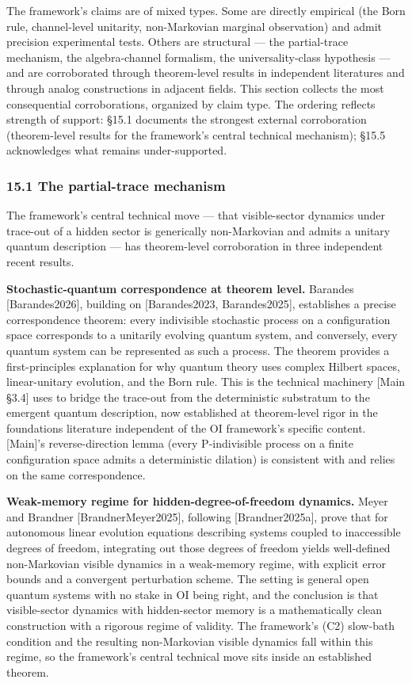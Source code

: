 \documentclass[
]{article}
\begin{document}
The framework's claims are of mixed types. Some are directly empirical
(the Born rule, channel-level unitarity, non-Markovian marginal
observation) and admit precision experimental tests. Others are
structural --- the partial-trace mechanism, the algebra-channel
formalism, the universality-class hypothesis --- and are corroborated
through theorem-level results in independent literatures and through
analog constructions in adjacent fields. This section collects the most
consequential corroborations, organized by claim type. The ordering
reflects strength of support: §15.1 documents the strongest external
corroboration (theorem-level results for the framework's central
technical mechanism); §15.5 acknowledges what remains under-supported.

\hypertarget{the-partial-trace-mechanism}{%
\subsubsection{15.1 The partial-trace
mechanism}\label{the-partial-trace-mechanism}}

The framework's central technical move --- that visible-sector dynamics
under trace-out of a hidden sector is generically non-Markovian and
admits a unitary quantum description --- has theorem-level corroboration
in three independent recent results.

\textbf{Stochastic-quantum correspondence at theorem level.} Barandes
{[}Barandes2026{]}, building on {[}Barandes2023, Barandes2025{]},
establishes a precise correspondence theorem: every indivisible
stochastic process on a configuration space corresponds to a unitarily
evolving quantum system, and conversely, every quantum system can be
represented as such a process. The theorem provides a first-principles
explanation for why quantum theory uses complex Hilbert spaces,
linear-unitary evolution, and the Born rule. This is the technical
machinery {[}Main §3.4{]} uses to bridge the trace-out from the
deterministic substratum to the emergent quantum description, now
established at theorem-level rigor in the foundations literature
independent of the OI framework's specific content. {[}Main{]}'s
reverse-direction lemma (every P-indivisible process on a finite
configuration space admits a deterministic dilation) is consistent with
and relies on the same correspondence.

\textbf{Weak-memory regime for hidden-degree-of-freedom dynamics.} Meyer
and Brandner {[}BrandnerMeyer2025{]}, following {[}Brandner2025a{]},
prove that for autonomous linear evolution equations describing systems
coupled to inaccessible degrees of freedom, integrating out those
degrees of freedom yields well-defined non-Markovian visible dynamics in
a weak-memory regime, with explicit error bounds and a convergent
perturbation scheme. The setting is general open quantum systems with no
stake in OI being right, and the conclusion is that visible-sector
dynamics with hidden-sector memory is a mathematically clean
construction with a rigorous regime of validity. The framework's (C2)
slow-bath condition and the resulting non-Markovian visible dynamics
fall within this regime, so the framework's central technical move sits
inside an established theorem.
\end{document}
